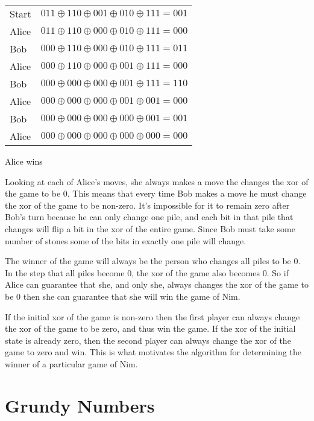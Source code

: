 \begin{center}
\begin{tabular}{l|c}
Start & $011 \oplus 110 \oplus 001 \oplus 010 \oplus 111 = 001$ \\

Alice & $011 \oplus 110 \oplus 000 \oplus 010 \oplus 111 = 000$ \\

Bob & $000 \oplus 110 \oplus 000 \oplus 010 \oplus 111 = 011$ \\

Alice & $000 \oplus 110 \oplus 000 \oplus 001 \oplus 111 = 000$ \\

Bob & $000 \oplus 000 \oplus 000 \oplus 001 \oplus 111 = 110$ \\

Alice & $000 \oplus 000 \oplus 000 \oplus 001 \oplus 001 = 000$ \\

Bob & $000 \oplus 000 \oplus 000 \oplus 000 \oplus 001 = 001$ \\

Alice & $000 \oplus 000 \oplus 000 \oplus 000 \oplus 000 = 000$ \\
\end{tabular}

\vspace{1em}

Alice wins

\end{center}

Looking at each of Alice's moves, she always makes a move the changes the xor of the game to be $0$. This means that every time Bob makes a move he must change the xor of the game to be non-zero. It's impossible for it to remain zero after Bob's turn because he can only change one pile, and each bit in that pile that changes will flip a bit in the xor of the entire game. Since Bob must take some number of stones some of the bits in exactly one pile will change.

The winner of the game will always be the person who changes all piles to be $0$. In the step that all piles become $0$, the xor of the game also becomes $0$. So if Alice can guarantee that she, and only she, always changes the xor of the game to be $0$ then she can guarantee that she will win the game of Nim.

If the initial xor of the game is non-zero then the first player can always change the xor of the game to be zero, and thus win the game. If the xor of the initial state is already zero, then the second player can always change the xor of the game to zero and win. This is what motivates the algorithm for determining the winner of a particular game of Nim.

\section{Grundy Numbers}
